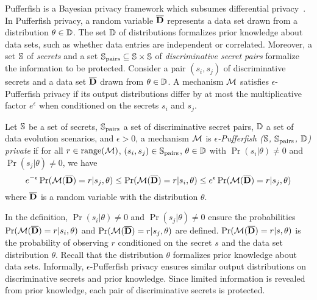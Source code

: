 Pufferfish is a Bayesian privacy framework which subsumes differential
privacy~\cite{KM:14:PFMPD}. In Pufferfish privacy, a random variable
$\overline{\mathbf{D}}$ represents a data set drawn from a distribution $\theta \in
\mathbb{D}$. The set $\mathbb{D}$ of distributions formalizes prior knowledge
about data sets, such as whether data entries are independent or
correlated. Moreover, a set $\mathbb{S}$ of \emph{secrets} and
a set $\mathbb{S}_{\textmd{pairs}} \subseteq \mathbb{S} \times \mathbb{S}$ of
\emph{discriminative secret pairs} formalize the information to be
protected. Consider a pair $(s_i, s_j)$ of discriminative secrets and
a data set $\overline{\mathbf{D}}$ drawn from $\theta \in \mathbb{D}$. A mechanism $\mathcal{M}$
satisfies $\epsilon$-Pufferfish privacy if its output distributions
differ by at most the multiplicative factor $e^{\epsilon}$ when
conditioned on the secrets $s_i$ and $s_j$.

\begin{definition}
  Let $\mathbb{S}$ be a set of secrets, $\mathbb{S}_{\textmd{pairs}}$ a set of
  discriminative secret pairs, $\mathbb{D}$ a set of data evolution
  scenarios, and $\epsilon > 0$, a mechanism $\mathcal{M}$ is
  \emph{$\epsilon$-Pufferfish ($\mathbb{S}$, $\mathbb{S}_{\textmd{pairs}}$,
    $\mathbb{D}$) private} if for all $r \in \textmd{range}(\mathcal{M})$, $(s_i, s_j) \in
    \mathbb{S}_{\textmd{pairs}}$, $\theta \in \mathbb{D}$ with $\Pr (s_i |
    \theta) \neq 0$ and $\Pr (s_j | \theta) \neq 0$, we have
    \[
      e^{-\epsilon} \Pr (\mathcal{M} (\overline{\mathbf{D}}) = r | s_j, \theta) \leq
      \Pr (\mathcal{M} (\overline{\mathbf{D}}) = r | s_i, \theta) \leq
      e^\epsilon \Pr (\mathcal{M} (\overline{\mathbf{D}}) = r | s_j, \theta)
    \]
    where $\overline{\mathbf{D}}$ is a random variable with the distribution $\theta$.
\end{definition}

In the definition, $\Pr (s_i | \theta) \neq 0$ and $\Pr (s_j | \theta)
\neq 0$ ensure the probabilities $\Pr (\mathcal{M} (\overline{\mathbf{D}}) = r | s_i, \theta)$
and $\Pr (\mathcal{M} (\overline{\mathbf{D}}) = r | s_j, \theta)$ are defined.
$\Pr (\mathcal{M} (\overline{\mathbf{D}}) = r | s, \theta)$ is the probability of observing
$r$ conditioned on the secret $s$ and the data set distribution $\theta$.
Recall that the distribution $\theta$ formalizes prior knowledge about
data sets. Informally, $\epsilon$-Pufferfish privacy ensures similar
output distributions on discriminative secrets and prior knowledge.
Since limited information is revealed from prior knowledge, each pair
of discriminative secrets is protected.

